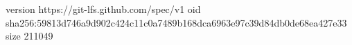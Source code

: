 version https://git-lfs.github.com/spec/v1
oid sha256:59813d746a9d902c424c11c0a7489b168dca6963e97c39d84db0de68ea427e33
size 211049

